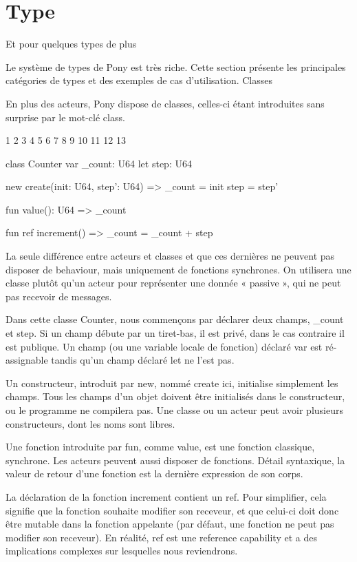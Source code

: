 \documentclass[11pt, oneside]{article}   	%
\begin{document}
\section{Type}
 Et pour quelques types de plus

Le système de types de Pony est très riche. Cette section présente les principales catégories de types et des exemples de cas d’utilisation.
Classes

En plus des acteurs, Pony dispose de classes, celles-ci étant introduites sans surprise par le mot-clé class.

 1
 2
 3
 4
 5
 6
 7
 8
 9
10
11
12
13

	

class Counter
  var _count: U64
  let step: U64

  new create(init: U64, step': U64) =>
    _count = init
    step = step'

  fun value(): U64 =>
    _count

  fun ref increment() =>
    _count = _count + step

La seule différence entre acteurs et classes et que ces dernières ne peuvent pas disposer de behaviour, mais uniquement de fonctions synchrones. On utilisera une classe plutôt qu’un acteur pour représenter une donnée « passive », qui ne peut pas recevoir de messages.

Dans cette classe Counter, nous commençons par déclarer deux champs, _count et step. Si un champ débute par un tiret-bas, il est privé, dans le cas contraire il est publique. Un champ (ou une variable locale de fonction) déclaré var est ré-assignable tandis qu’un champ déclaré let ne l’est pas.

Un constructeur, introduit par new, nommé create ici, initialise simplement les champs. Tous les champs d’un objet doivent être initialisés dans le constructeur, ou le programme ne compilera pas. Une classe ou un acteur peut avoir plusieurs constructeurs, dont les noms sont libres.

Une fonction introduite par fun, comme value, est une fonction classique, synchrone. Les acteurs peuvent aussi disposer de fonctions. Détail syntaxique, la valeur de retour d’une fonction est la dernière expression de son corps.

La déclaration de la fonction increment contient un ref. Pour simplifier, cela signifie que la fonction souhaite modifier son receveur, et que celui-ci doit donc être mutable dans la fonction appelante (par défaut, une fonction ne peut pas modifier son receveur). En réalité, ref est une reference capability et a des implications complexes sur lesquelles nous reviendrons.
\end{document}

